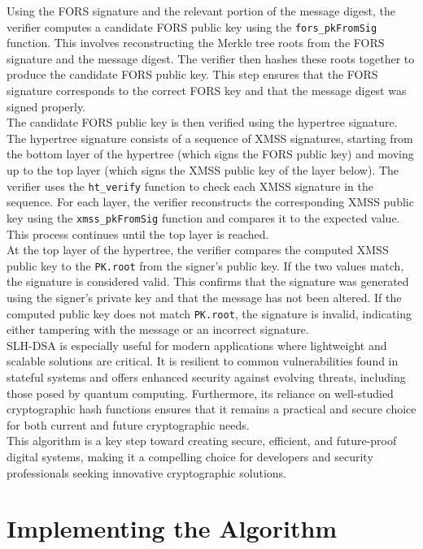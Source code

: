 \documentclass[journal=tosc,notanonymous]{iacrtrans}
\begin{document}
Using the FORS signature and the relevant portion of the message digest, the verifier computes a candidate FORS public key using the \verb|fors_pkFromSig| function. This involves reconstructing the Merkle tree roots from the FORS signature and the message digest. The verifier then hashes these roots together to produce the candidate FORS public key. This step ensures that the FORS signature corresponds to the correct FORS key and that the message digest was signed properly.\\
The candidate FORS public key is then verified using the hypertree signature. The hypertree signature consists of a sequence of XMSS signatures, starting from the bottom layer of the hypertree (which signs the FORS public key) and moving up to the top layer (which signs the XMSS public key of the layer below). The verifier uses the \verb|ht_verify| function to check each XMSS signature in the sequence. For each layer, the verifier reconstructs the corresponding XMSS public key using the \verb|xmss_pkFromSig| function and compares it to the expected value. This process continues until the top layer is reached.\\
At the top layer of the hypertree, the verifier compares the computed XMSS public key to the \texttt{PK.root} from the signer's public key. If the two values match, the signature is considered valid. This confirms that the signature was generated using the signer's private key and that the message has not been altered. If the computed public key does not match \texttt{PK.root}, the signature is invalid, indicating either tampering with the message or an incorrect signature.\\
\newline
SLH-DSA is especially useful for modern applications where lightweight and scalable solutions are critical. It is resilient to common vulnerabilities found in stateful systems and offers enhanced security against evolving threats, including those posed by quantum computing. Furthermore, its reliance on well-studied cryptographic hash functions ensures that it remains a practical and secure choice for both current and future cryptographic needs.
\\
This algorithm is a key step toward creating secure, efficient, and future-proof digital systems, making it a compelling choice for developers and security professionals seeking innovative cryptographic solutions.


\section{Implementing the Algorithm}
\end{document}
